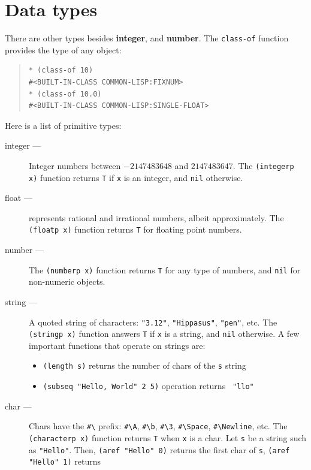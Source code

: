 \documentclass[a4paper,12pt]{book}
\begin{document}
\section{Data types}
There are other types besides {\bf integer}, and {\bf number}.
The \verb|class-of| function provides the type of any object:
\begin{quote}
\begin{verbatim}
* (class-of 10)
#<BUILT-IN-CLASS COMMON-LISP:FIXNUM>
* (class-of 10.0)
#<BUILT-IN-CLASS COMMON-LISP:SINGLE-FLOAT>
\end{verbatim}
\end{quote}
Here is a  list of primitive types:
\begin{description}
\item[integer ---] Integer numbers between $-2147483648$ and $2147483647$. 
The \verb|(integerp x)| function returns \verb|T| if \verb|x|
is an integer, and \verb|nil| otherwise.
\item[float ---] represents rational and irrational numbers,
albeit approximately. The \verb|(floatp x)|
function returns \verb|T| for floating point
numbers.
\item[number ---] The \verb|(numberp x)| function returns
\verb|T| for any type of numbers, and \verb|nil| for non-numeric
objects.
\item[string ---] A quoted string 
of characters: \verb|"3.12"|, \verb|"Hippasus"|, \verb|"pen"|, etc.
The \verb|(stringp x)| function answers \verb|T| 
if \verb|x| is a string, 
and \verb|nil| otherwise.
A few important functions that operate on strings are:
\begin{itemize}
\item \verb|(length s)| returns the number
of chars of the \verb|s| string
\item\verb|(subseq "Hello, World" 2 5)| operation
returns \verb| "llo"|
\end{itemize}
\item[char ---] Chars have the \verb|#\|
  prefix: 
\verb|#\A|,
\verb|#\b|, \verb|#\3|, \verb|#\Space|,
\verb|#\Newline|, etc.
The \verb|(characterp x)| function returns \verb|T|
when \verb|x| is a char.
Let \verb|s| be
a string such as \verb|"Hello"|. Then,
\verb|(aref "Hello" 0)|
returns the first char of \verb|s|,
\verb|(aref "Hello" 1)| returns

\end{description}
\end{document}
